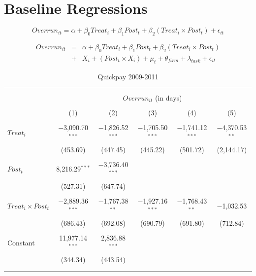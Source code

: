 \documentclass[
]{article}
\begin{document}
\hypertarget{baseline-regressions}{%
\section{Baseline Regressions}\label{baseline-regressions}}

\[ Overrun_{it} = \alpha+\beta_0 Treat_i + \beta_1 Post_t + \beta_2 (Treat_i \times Post_t) + \epsilon_{it}\]

\[ \begin{aligned} Overrun_{it} &=& \alpha+\beta_0 Treat_i + \beta_1 Post_t + \beta_2 (Treat_i \times Post_t)\\
&+&  X_i + (Post_t \times X_i) + \mu_t + \theta_{firm} + \lambda_{task}+ \epsilon_{it}
\end{aligned}\]

\begin{table}[H] \centering 
  \caption{Quickpay 2009-2011} 
  \label{} 
\small 
\begin{tabular}{@{\extracolsep{-2pt}}lccccc} 
\\[-1.8ex]\hline 
\hline \\[-1.8ex] 
\\[-1.8ex] & \multicolumn{5}{c}{$Overrun_{it}$ (in days)} \\ 
\\[-1.8ex] & (1) & (2) & (3) & (4) & (5)\\ 
\hline \\[-1.8ex] 
 $Treat_i$ & $-$3,090.70$^{***}$ & $-$1,826.52$^{***}$ & $-$1,705.50$^{***}$ & $-$1,741.12$^{***}$ & $-$4,370.53$^{**}$ \\ 
  & (453.69) & (447.45) & (445.22) & (501.72) & (2,144.17) \\ 
  & & & & & \\ 
 $Post_t$ & 8,216.29$^{***}$ & $-$3,736.40$^{***}$ &  &  &  \\ 
  & (527.31) & (647.74) &  &  &  \\ 
  & & & & & \\ 
 $Treat_i \times Post_t$ & $-$2,889.36$^{***}$ & $-$1,767.38$^{**}$ & $-$1,927.16$^{***}$ & $-$1,768.43$^{**}$ & $-$1,032.53 \\ 
  & (686.43) & (692.08) & (690.79) & (691.80) & (712.84) \\ 
  & & & & & \\ 
 Constant & 11,977.14$^{***}$ & 2,836.88$^{***}$ &  &  &  \\ 
  & (344.34) & (443.54) &  &  &  \\ 
  & & & & & \\ 
\hline \\[-1.8ex] 

\end{tabular}
\end{table}
\end{document}
